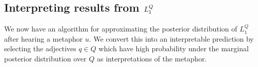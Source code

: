 \documentclass[OpenMind]{stjour}
\newcommand{\Listener}{L}
\newcommand{\QLONE}{\Listener_{{1}}^{{Q}}}
\begin{document}


\subsection{Interpreting results from $\protect\QLONE$}

	We now have an algorithm for approximating the posterior distribution of $\QLONE$ after hearing a metaphor $u$. We convert this into an interpretable prediction by selecting the adjectives $q\in Q$ which have high probability under the marginal posterior distribution over $Q$ as interpretations of the metaphor.




\end{document}
